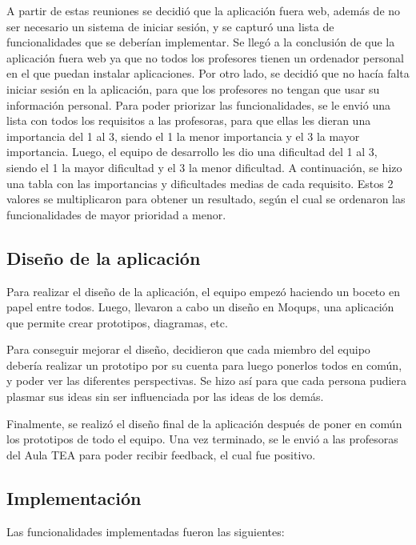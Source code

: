 A partir de estas reuniones se decidió que la aplicación fuera web, además de no ser necesario un sistema de iniciar sesión, y se capturó una lista de funcionalidades que se deberían implementar. Se llegó a la conclusión de que la aplicación fuera web ya que no todos los profesores tienen un ordenador personal en el que puedan instalar aplicaciones. Por otro lado, se decidió que no hacía falta iniciar sesión en la aplicación, para que los profesores no tengan que usar su información personal. Para poder priorizar las funcionalidades, se le envió una lista con todos los requisitos a las profesoras, para que ellas les dieran una importancia del 1 al 3, siendo el 1 la menor importancia y el 3 la mayor importancia. Luego, el equipo de desarrollo les dio una dificultad del 1 al 3, siendo el 1 la mayor dificultad y el 3 la menor dificultad. A continuación, se hizo una tabla con las importancias y dificultades medias de cada requisito. Estos 2 valores se multiplicaron para obtener un resultado, según el cual se ordenaron las funcionalidades de mayor prioridad a menor.


\subsection{Diseño de la aplicación}
Para realizar el diseño de la aplicación, el equipo empezó haciendo un boceto en papel entre todos. Luego, llevaron a cabo un diseño en Moqups,  una aplicación que permite crear prototipos, diagramas, etc. 

Para conseguir mejorar el diseño, decidieron que cada miembro del equipo debería realizar un prototipo por su cuenta para luego ponerlos todos en común, y poder ver las diferentes perspectivas. Se hizo así para que cada persona pudiera plasmar sus ideas sin ser influenciada por las ideas de los demás.

Finalmente, se realizó el diseño final de la aplicación después de poner en común los prototipos de todo el equipo. Una vez terminado, se le envió a las profesoras del Aula TEA para poder recibir feedback, el cual fue positivo.


\subsection{Implementación}
Las funcionalidades implementadas fueron las siguientes:

